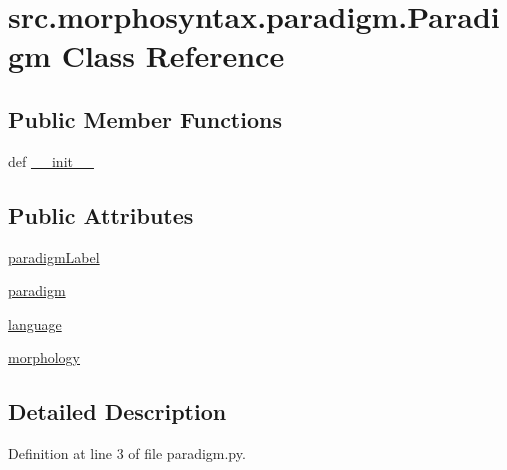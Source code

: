 \hypertarget{classsrc_1_1morphosyntax_1_1paradigm_1_1_paradigm}{\section{src.\+morphosyntax.\+paradigm.\+Paradigm Class Reference}
\label{classsrc_1_1morphosyntax_1_1paradigm_1_1_paradigm}
}
\subsection*{Public Member Functions}
\begin{DoxyCompactItemize}
\item 
def \hyperlink{classsrc_1_1morphosyntax_1_1paradigm_1_1_paradigm_a4406d466889b7ca626bf043b3654b6ad}{\+\_\+\+\_\+init\+\_\+\+\_\+}
\end{DoxyCompactItemize}
\subsection*{Public Attributes}
\begin{DoxyCompactItemize}
\item 
\hyperlink{classsrc_1_1morphosyntax_1_1paradigm_1_1_paradigm_a53996d262b7c39f45cf3daec60ff0e39}{paradigm\+Label}
\item 
\hyperlink{classsrc_1_1morphosyntax_1_1paradigm_1_1_paradigm_aef28fdb51b77696c54e77470db8fc9ae}{paradigm}
\item 
\hyperlink{classsrc_1_1morphosyntax_1_1paradigm_1_1_paradigm_a4b3e5aa320792c052f0e8e7d50fc343d}{language}
\item 
\hyperlink{classsrc_1_1morphosyntax_1_1paradigm_1_1_paradigm_a565900f79670711f1b9774bf0e0c2c9b}{morphology}
\end{DoxyCompactItemize}


\subsection{Detailed Description}


Definition at line 3 of file paradigm.\+py.



